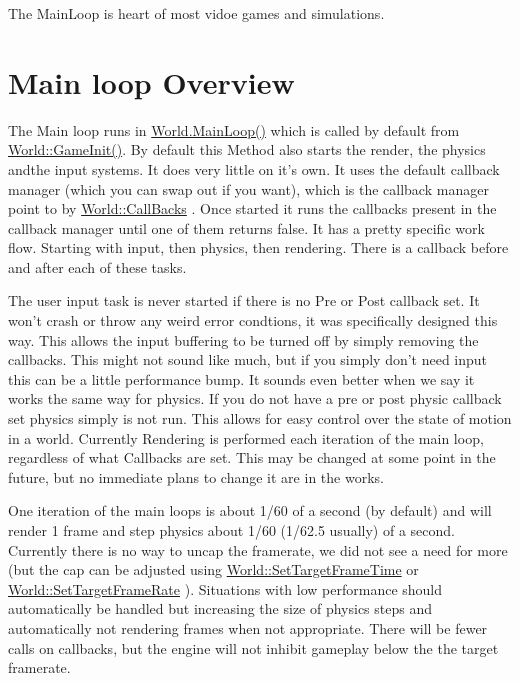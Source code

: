 The MainLoop is heart of most vidoe games and simulations.\hypertarget{dd/d99/mainloop1_mainloopoverview1}{}\section{Main loop Overview}\label{dd/d99/mainloop1_mainloopoverview1}
The Main loop runs in \hyperlink{classphys_1_1World_af1d9e36d43f5e50543fa2351a32c8362}{World.MainLoop()} which is called by default from \hyperlink{classphys_1_1World_a21cc36be08a61f40619584d4c438936b}{World::GameInit()}. By default this Method also starts the render, the physics andthe input systems. It does very little on it's own. It uses the default callback manager (which you can swap out if you want), which is the callback manager point to by \hyperlink{classphys_1_1World_a22a1624c63198f49fdf8e448881bdb2e}{World::CallBacks} . Once started it runs the callbacks present in the callback manager until one of them returns false. It has a pretty specific work flow. Starting with input, then physics, then rendering. There is a callback before and after each of these tasks. \par
 \par
 The user input task is never started if there is no Pre or Post callback set. It won't crash or throw any weird error condtions, it was specifically designed this way. This allows the input buffering to be turned off by simply removing the callbacks. This might not sound like much, but if you simply don't need input this can be a little performance bump. It sounds even better when we say it works the same way for physics. If you do not have a pre or post physic callback set physics simply is not run. This allows for easy control over the state of motion in a world. Currently Rendering is performed each iteration of the main loop, regardless of what Callbacks are set. This may be changed at some point in the future, but no immediate plans to change it are in the works. \par
 \par
 One iteration of the main loops is about 1/60 of a second (by default) and will render 1 frame and step physics about 1/60 (1/62.5 usually) of a second. Currently there is no way to uncap the framerate, we did not see a need for more (but the cap can be adjusted using \hyperlink{classphys_1_1World_ad95b5a5ad73e0a05826b5bd834876333}{World::SetTargetFrameTime} or \hyperlink{classphys_1_1World_a76dfcde35392291aafd6eb1a64b3c95c}{World::SetTargetFrameRate} ). Situations with low performance should automatically be handled but increasing the size of physics steps and automatically not rendering frames when not appropriate. There will be fewer calls on callbacks, but the engine will not inhibit gameplay below the the target framerate. \par
